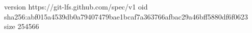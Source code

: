 version https://git-lfs.github.com/spec/v1
oid sha256:abf015a4539db0a79407479bae1bcaf7a363766afbac29a46bff5880df6f0623
size 254566

